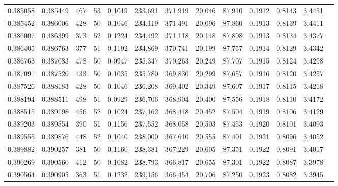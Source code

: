 \begin{tabular}{rrrrrrrrrrrrr}
0.385058 & 0.385449 &   467 &  53 &                                     0.1019 & 233,691 & 371,919 &  20,046 &  87,910 & 0.1912 & 0.8143 & 3.4451 \\
0.385452 & 0.386006 &   428 &  50 &                                     0.1046 & 234,119 & 371,491 &  20,096 &  87,860 & 0.1913 & 0.8139 & 3.4411 \\
0.386007 & 0.386399 &   373 &  52 &                                     0.1224 & 234,492 & 371,118 &  20,148 &  87,808 & 0.1913 & 0.8134 & 3.4377 \\
0.386405 & 0.386763 &   377 &  51 &                                     0.1192 & 234,869 & 370,741 &  20,199 &  87,757 & 0.1914 & 0.8129 & 3.4342 \\
0.386763 & 0.387083 &   478 &  50 &                                     0.0947 & 235,347 & 370,263 &  20,249 &  87,707 & 0.1915 & 0.8124 & 3.4298 \\
0.387091 & 0.387520 &   433 &  50 &                                     0.1035 & 235,780 & 369,830 &  20,299 &  87,657 & 0.1916 & 0.8120 & 3.4257 \\
0.387526 & 0.388183 &   428 &  50 &                                     0.1046 & 236,208 & 369,402 &  20,349 &  87,607 & 0.1917 & 0.8115 & 3.4218 \\
0.388194 & 0.388511 &   498 &  51 &                                     0.0929 & 236,706 & 368,904 &  20,400 &  87,556 & 0.1918 & 0.8110 & 3.4172 \\
0.388515 & 0.389198 &   456 &  52 &                                     0.1024 & 237,162 & 368,448 &  20,452 &  87,504 & 0.1919 & 0.8106 & 3.4129 \\
0.389203 & 0.389554 &   390 &  51 &                                     0.1156 & 237,552 & 368,058 &  20,503 &  87,453 & 0.1920 & 0.8101 & 3.4093 \\
0.389555 & 0.389876 &   448 &  52 &                                     0.1040 & 238,000 & 367,610 &  20,555 &  87,401 & 0.1921 & 0.8096 & 3.4052 \\
0.389882 & 0.390257 &   381 &  50 &                                     0.1160 & 238,381 & 367,229 &  20,605 &  87,351 & 0.1922 & 0.8091 & 3.4017 \\
0.390269 & 0.390560 &   412 &  50 &                                     0.1082 & 238,793 & 366,817 &  20,655 &  87,301 & 0.1922 & 0.8087 & 3.3978 \\
0.390564 & 0.390905 &   363 &  51 &                                     0.1232 & 239,156 & 366,454 &  20,706 &  87,250 & 0.1923 & 0.8082 & 3.3945 \\

\end{tabular}
